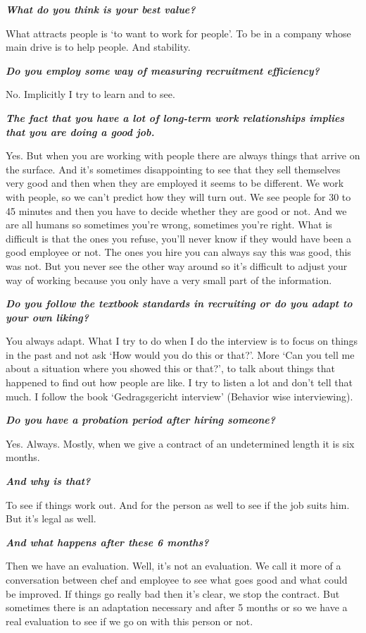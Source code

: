\documentclass[a4paper,fleqn,11pt,dvips,titlepage]{article}
\newcommand{\question}[1]{\textbf{\textit{#1}}}
\numberwithin{figure}{section}
\numberwithin{equation}{section}
\begin{document}
\question{What do you think is your best value?}

What attracts people is ‘to want to work for people’. To be in a company whose main drive is to help people. And stability. 

\question{Do you employ some way of measuring recruitment efficiency?}

No. Implicitly I try to learn and to see. 

\question{The fact that you have a lot of long-term work relationships implies that you are doing a good job.}

Yes. But when you are working with people there are always things that arrive on the surface. And it’s sometimes disappointing to see that they sell themselves very good and then when they are employed it seems to be different. We work with people, so we can’t predict how they will turn out. We see people for 30 to 45 minutes and then you have to decide whether they are good or not. And we are all humans so sometimes you’re wrong, sometimes you’re right. What is difficult is that the ones you refuse, you’ll never know if they would have been a good employee or not. The ones you hire you can always say this was good, this was not. But you never see the other way around so it’s difficult to adjust your way of working because you only have a very small part of the information. 

\question{Do you follow the textbook standards in recruiting or do you adapt to your own liking?}

You always adapt. What I try to do when I do the interview is to focus on things in the past and not ask ‘How would you do this or that?’. More ‘Can you tell me about a situation where you showed this or that?’, to talk about things that happened to find out how people are like. I try to listen a lot and don’t tell that much. I follow the book ‘Gedragsgericht interview’ (Behavior wise interviewing).

\question{Do you have a probation period after hiring someone?}

Yes. Always. Mostly, when we give a contract of an undetermined length it is six months. 

\question{And why is that?}

To see if things work out. And for the person as well to see if the job suits him. But it’s legal as well. 

\question{And what happens after these 6 months?}

Then we have an evaluation. Well, it’s not an evaluation. We call it more of a conversation between chef and employee to see what goes good and what could be improved. If things go really bad then it’s clear, we stop the contract. But sometimes there is an adaptation necessary and after 5 months or so we have a real evaluation to see if we go on with this person or not. 
\end{document}
